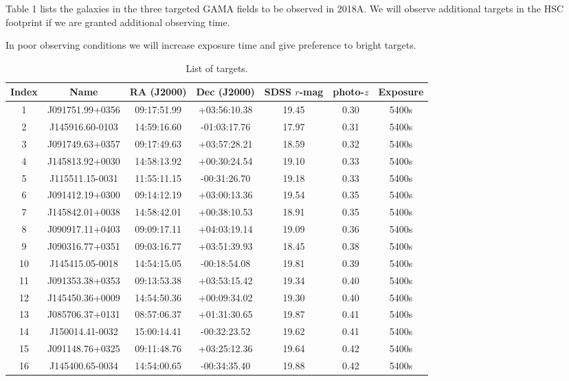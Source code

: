 \documentclass[letterpaper,12pt]{article}
\begin{document}
Table 1 lists the galaxies in the three targeted GAMA fields to be observed in 2018A. We will observe additional
targets in the HSC footprint if we are granted additional observing time.

In poor observing conditions we will increase exposure time and give preference to bright targets. 

\begin{table}
\caption{List of targets.}
\begin{tabular}{ccccccc}
\hline

Index & Name & RA (J2000) & Dec (J2000) & SDSS $r$-mag & photo-$z$ & Exposure \\
\hline
 1 & J091751.99+0356 & 09:17:51.99 & +03:56:10.38 & 19.45 & 0.30 & 5400s \\
 2 & J145916.60-0103 & 14:59:16.60 & -01:03:17.76 & 17.97 & 0.31 & 5400s \\
 3 & J091749.63+0357 & 09:17:49.63 & +03:57:28.21 & 18.59 & 0.32 & 5400s \\
 4 & J145813.92+0030 & 14:58:13.92 & +00:30:24.54 & 19.10 & 0.33 & 5400s \\
 5 & J115511.15-0031 & 11:55:11.15 & -00:31:26.70 & 19.18 & 0.33 & 5400s \\
 6 & J091412.19+0300 & 09:14:12.19 & +03:00:13.36 & 19.54 & 0.35 & 5400s \\
 7 & J145842.01+0038 & 14:58:42.01 & +00:38:10.53 & 18.91 & 0.35 & 5400s \\
 8 & J090917.11+0403 & 09:09:17.11 & +04:03:19.14 & 19.09 & 0.36 & 5400s \\
 9 & J090316.77+0351 & 09:03:16.77 & +03:51:39.93 & 18.45 & 0.38 & 5400s \\
10 & J145415.05-0018 & 14:54:15.05 & -00:18:54.08 & 19.81 & 0.39 & 5400s \\
11 & J091353.38+0353 & 09:13:53.38 & +03:53:15.42 & 19.34 & 0.40 & 5400s \\
12 & J145450.36+0009 & 14:54:50.36 & +00:09:34.02 & 19.30 & 0.40 & 5400s \\
13 & J085706.37+0131 & 08:57:06.37 & +01:31:30.65 & 19.87 & 0.41 & 5400s \\
14 & J150014.41-0032 & 15:00:14.41 & -00:32:23.52 & 19.62 & 0.41 & 5400s \\
15 & J091148.76+0325 & 09:11:48.76 & +03:25:12.36 & 19.64 & 0.42 & 5400s \\
16 & J145400.65-0034 & 14:54:00.65 & -00:34:35.40 & 19.88 & 0.42 & 5400s \\

\end{tabular}
\end{table}
\end{document}
